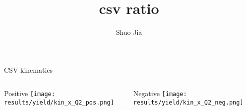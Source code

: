 \documentclass[aspectratio=169,xcolor=dvipsnames]{beamer}
\title{csv ratio}
\date{}
\author{Shuo Jia}
\begin{document}
\maketitle


\begin{frame}{CSV kinematics}
\begin{columns}
\begin{column}[T]{0.5\textwidth}
Positive
\texttt{[image: results/yield/kin\_x\_Q2\_pos.png]}
\end{column}
\begin{column}[T]{0.5\textwidth}
Negative
\texttt{[image: results/yield/kin\_x\_Q2\_neg.png]}
\end{column}
\end{columns}
\end{frame}
%



\end{document}
